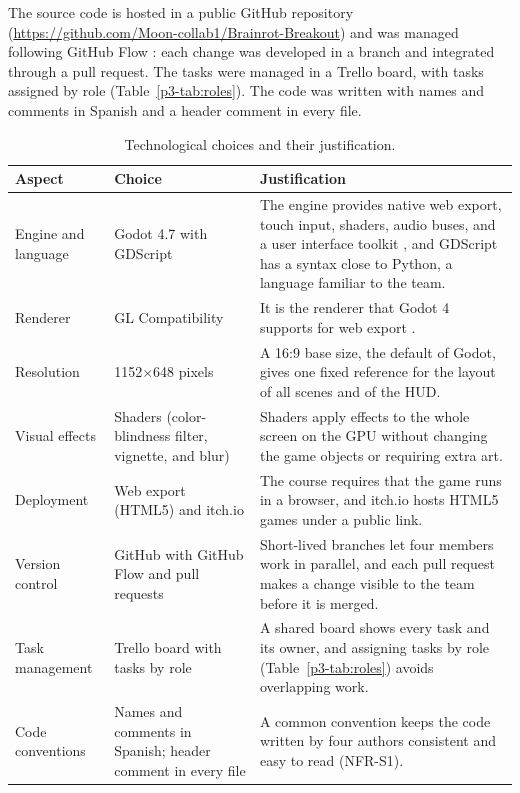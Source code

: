 \documentclass[conference]{IEEEtran}
\begin{document}
The source code is hosted in a public GitHub repository (\url{https://github.com/Moon-collab1/Brainrot-Breakout}) and was managed following GitHub Flow \cite{githubflow}: each change was developed in a branch and integrated through a pull request. The tasks were managed in a Trello board, with tasks assigned by role (Table~\ref{p3-tab:roles}). The code was written with names and comments in Spanish and a header comment in every file.

\begin{table}[t]
\caption{Technological choices and their justification.}
\label{p3-tab:tech}
\centering
\small
\begin{tabularx}{\textwidth}{@{}p{2.8cm}p{4.6cm}X@{}}
\toprule
\textbf{Aspect} & \textbf{Choice} & \textbf{Justification} \\
\midrule
Engine and language & Godot 4.7 with GDScript & The engine provides native web export, touch input, shaders, audio buses, and a user interface toolkit \cite{godotdocs}, and GDScript has a syntax close to Python, a language familiar to the team. \\
Renderer & GL Compatibility & It is the renderer that Godot 4 supports for web export \cite{godotdocs}. \\
Resolution & 1152$\times$648 pixels & A 16:9 base size, the default of Godot, gives one fixed reference for the layout of all scenes and of the HUD. \\
Visual effects & Shaders (color-blindness filter, vignette, and blur) & Shaders apply effects to the whole screen on the GPU without changing the game objects or requiring extra art. \\
Deployment & Web export (HTML5) and itch.io & The course requires that the game runs in a browser, and itch.io hosts HTML5 games under a public link. \\
Version control & GitHub with GitHub Flow and pull requests \cite{githubflow} & Short-lived branches let four members work in parallel, and each pull request makes a change visible to the team before it is merged. \\
Task management & Trello board with tasks by role & A shared board shows every task and its owner, and assigning tasks by role (Table~\ref{p3-tab:roles}) avoids overlapping work. \\
Code conventions & Names and comments in Spanish; header comment in every file & A common convention keeps the code written by four authors consistent and easy to read (NFR-S1). \\
\bottomrule
\end{tabularx}
\end{table}
\end{document}
